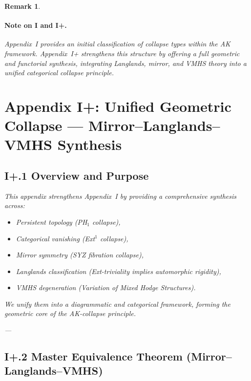 \documentclass[11pt]{article}
\newtheorem{remark}[theorem]{Remark}
\begin{document}
\begin{remark}
\paragraph{Note on I and I+.}
Appendix~I provides an initial classification of collapse types within the AK framework.  
Appendix~I+ strengthens this structure by offering a full geometric and functorial synthesis, integrating Langlands, mirror, and VMHS theory into a unified categorical collapse principle.



\section*{Appendix I+: Unified Geometric Collapse — Mirror–Langlands–VMHS Synthesis}

\subsection*{I+.1 Overview and Purpose}

This appendix strengthens Appendix~I by providing a comprehensive synthesis across:
\begin{itemize}
  \item Persistent topology (PH$_1$ collapse),
  \item Categorical vanishing (Ext$^1$ collapse),
  \item Mirror symmetry (SYZ fibration collapse),
  \item Langlands classification (Ext-triviality implies automorphic rigidity),
  \item VMHS degeneration (Variation of Mixed Hodge Structures).
\end{itemize}

We unify them into a diagrammatic and categorical framework, forming the geometric core of the AK-collapse principle.

---

\subsection*{I+.2 Master Equivalence Theorem (Mirror–Langlands–VMHS)}


\end{remark}
\end{document}
